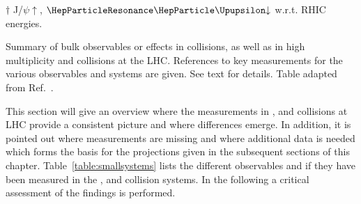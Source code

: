\documentclass[../report.tex]{subfiles}
\begin{document}
{\begin{landscape}
\begin{table}[h!]
\begin{center}
\begin{minipage}[l]{22.5cm}
\begin{flushleft}
$\dagger$ J/$\psi \uparrow$, $\PGUP \downarrow$ w.r.t. RHIC energies.
\end{flushleft}
\end{minipage}
\caption{\label{table:smallsystems} Summary of bulk observables or effects in \PbPb collisions, as well as in high multiplicity \pPb and \pp collisions at the LHC. References to key measurements for the various observables and systems are given. See text for details. Table adapted from Ref.~\cite{Loizides:2016tew}.}
\end{center}
\end{table}
\end{landscape}
}

This section will give an overview where the measurements in \PbPb, \pPb and \pp collisions at LHC provide a consistent picture and where differences emerge. In addition, it is pointed out where measurements are missing and where additional data is needed which forms the basis for the projections given in the subsequent sections of this chapter. Table~\ref{table:smallsystems} lists the different observables and if they have been measured in the \PbPb, \pPb and \pp collision systems. In the following a critical assessment of the findings is performed.
\end{document}
